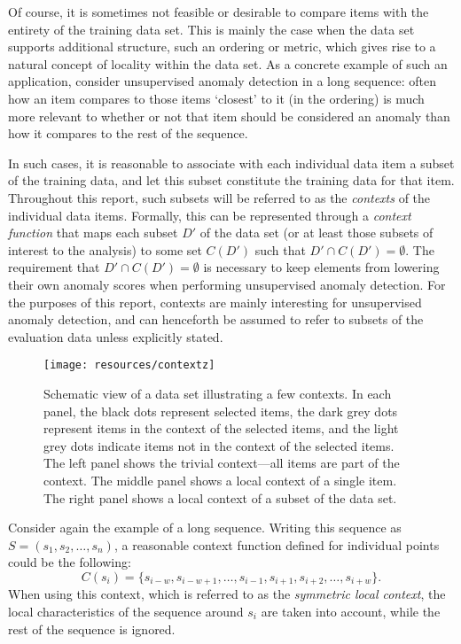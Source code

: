 Of course, it is sometimes not feasible or desirable to compare items with the entirety of the training data set. This is mainly the case when the data set supports additional structure, such an ordering or metric, which gives rise to a natural concept of locality within the data set. As a concrete example of such an application, consider unsupervised anomaly detection in a long sequence: often how an item compares to those items `closest' to it (in the ordering) is much more relevant to whether or not that item should be considered an anomaly than how it compares to the rest of the sequence.

In such cases, it is reasonable to associate with each individual data item a subset of the training data, and let this subset constitute the training data for that item. Throughout this report, such subsets will be referred to as the \emph{contexts} of the individual data items. Formally, this can be represented through a \emph{context function} that maps each subset $D'$ of the data set (or at least those subsets of interest to the analysis) to some set $C(D')$ such that $D' \cap C(D') = \emptyset$. The requirement that $D' \cap C(D') = \emptyset$ is necessary to keep elements from lowering their own anomaly scores when performing unsupervised anomaly detection. For the purposes of this report, contexts are mainly interesting for unsupervised anomaly detection, and can henceforth be assumed to refer to subsets of the evaluation data unless explicitly stated.

\begin{figure}[thb]
    \vspace{-4pt}
    \begin{center}
        \leavevmode
        \texttt{[image: resources/contextz]}
    \end{center}
    \vspace{-15pt}
    \caption{{\small Schematic view of a data set illustrating a few contexts. In each panel, the black dots represent selected items, the dark grey dots represent items in the context of the selected items, and the light grey dots indicate items not in the context of the selected items. The left panel shows the trivial context---all items are part of the context. The middle panel shows a local context of a single item. The right panel shows a local context of a subset of the data set.}}
\label{fig:contexts}
    \vspace{-5pt}
\end{figure}

Consider again the example of a long sequence. Writing this sequence as $S = (s_1, s_2, \dots, s_n)$, a reasonable context function defined for individual points could be the following:
\[
    C(s_i) = \{s_{i-w}, s_{i - w + 1}, \dots, s_{i - 1}, s_{i + 1}, s_{i + 2}, \dots, s_{i + w}\}.
\]
When using this context, which is referred to as the \emph{symmetric local context}, the local characteristics of the sequence around $s_i$ are taken into account, while the rest of the sequence is ignored.

